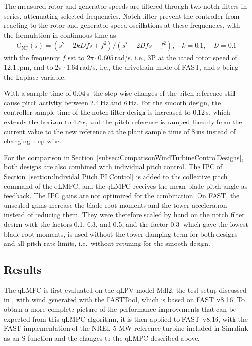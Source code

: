 
The measured rotor and generator speeds are filtered through two notch filters in series, attenuating selected frequencies. Notch filter prevent the controller from reacting to the rotor and generator speed oscillations at these frequencies, with the formulation in continuous time as
\begin{align*}
    G_\text{NF}(s) = (s^2 + 2kDfs + f^2)/(s^2 + 2Dfs + f^2), \quad k = 0.1, \quad D = 0.1
\end{align*}
with the frequency $f$  set to $2\pi \cdot 0.605$\,rad/s, i.e., 3P at the rated rotor speed of 12.1\,rpm, and to $2\pi \cdot 1.64$\,rad/s, i.e., the drivetrain mode of FAST, and $s$ being the Laplace variable.



With a sample time of 0.04\,s, the step-wise changes of the pitch reference still cause pitch activity between 2.4\,Hz and 6\,Hz. For the smooth design, the controller sample time of the notch filter design is increased to 0.12\,s, which extends the horizon to 4.8\,s, and the pitch reference is ramped linearly from the current value to the new reference at the plant sample time of 8\,ms instead of changing step-wise.

For the comparison in Section~\ref{subsec:ComparisonWindTurbineControlDesigns}, both designs are also combined with individual pitch control. The IPC of Section~\ref{section:Individal Pitch PI Control} is added to the collective pitch command of the qLMPC, and the qLMPC receives the mean blade pitch angle as feedback. The IPC gains are not optimized for the combination. On FAST, the unscaled gains increase the blade root moments and the tower acceleration instead of reducing them. They were therefore scaled by hand on the notch filter design with the factors 0.1, 0.3, and 0.5, and the factor 0.3, which gave the lowest blade root moments, is used without the tower damping term for both designs and all pitch rate limits, i.e.\ without retuning for the smooth design.

\subsection{Results} \label{quasiLPVMPCResults}
The qLMPC is first evaluated on the qLPV model Mdl2, the test setup discussed in \cite{dittmer2021velocity}, with wind generated with the FASTTool, which is based on FAST~v8.16. To obtain a more complete picture of the performance improvements that can be expected from this qLMPC algorithm, it is then applied to FAST~v8.16, with the FAST implementation of the NREL 5-MW reference turbine included in Simulink as an S-function and the changes to the qLMPC described above.

